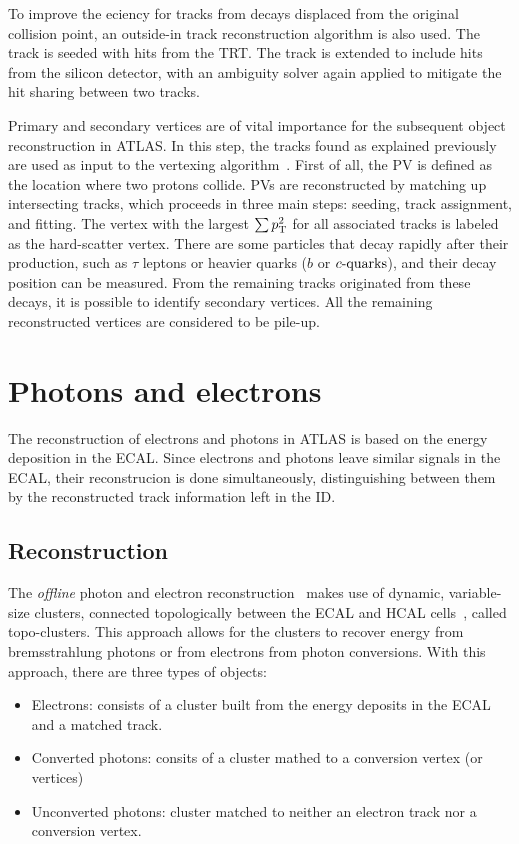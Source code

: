 To improve the eciency for tracks from decays displaced from the original collision point, an outside-in track reconstruction algorithm is also used. The track is seeded with hits from the \ac{TRT}. The track is extended to include hits from the silicon detector, with an ambiguity solver again applied to mitigate the hit sharing between two tracks.

Primary and secondary vertices are of vital importance for the subsequent object reconstruction in \ac{ATLAS}. In this step, the tracks found as explained previously are used as input to the vertexing algorithm~\cite{ATLASPVReconstruction,ATLASVertexReconstruction}. First of all, the \ac{PV} is defined as the location where two protons collide. \acp{PV} are reconstructed by matching up intersecting tracks, which proceeds in three main steps: seeding, track assignment, and fitting. The vertex with the largest \(\sum p_{\text{T}}^2\) for all associated tracks is labeled as the hard-scatter vertex. There are some particles that decay rapidly after their production, such as \(\tau\) leptons or heavier quarks (\(b\) or \(c\text{-quarks}\)), and their decay position can be measured. From the remaining tracks originated from these decays, it is possible to identify secondary vertices. All the remaining reconstructed vertices are considered to be pile-up.








\section{Photons and electrons}

The reconstruction of electrons and photons in \ac{ATLAS} is based on the energy deposition in the \ac{ECAL}. Since electrons and photons leave similar signals in the \ac{ECAL}, their reconstrucion is done simultaneously, distinguishing between them by the reconstructed track information left in the \ac{ID}.


\subsection{Reconstruction}
\label{subsec:objects:egamma:reco}

The \textit{offline} photon and electron reconstruction~\cite{ATLASEGammaPerformance20152017,ATLASTopoClustersRun2} makes use of dynamic, variable-size clusters, connected topologically between the \ac{ECAL} and \ac{HCAL} cells~\cite{ATLASTopoClustersRun1}, called topo-clusters. This approach allows for the clusters to recover energy from bremsstrahlung photons or from electrons from photon conversions. With this approach, there are three types of objects:
\begin{itemize}
    \item Electrons: consists of a cluster built from the energy deposits in the \ac{ECAL} and a matched track.
    \item Converted photons: consits of a cluster mathed to a conversion vertex (or vertices)
    \item Unconverted photons: cluster matched to neither an electron track nor a conversion vertex.
\end{itemize}

